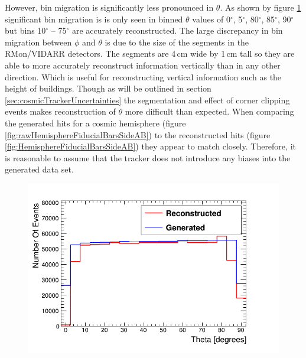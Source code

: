 \clearpage
However, bin migration is significantly less pronounced in $\theta$. As shown by figure \ref{fig:thetaGenVsRecoHem} significant bin migration is is only seen in binned $\theta$ values of 0$^\circ$, 5$^\circ$, 80$^\circ$, 85$^\circ$, 90$^\circ$ but bins 10$^\circ$ -- 75$^\circ$ are accurately reconstructed. The large discrepancy in bin migration between $\phi$ and $\theta$ is due to the size of the segments in the RMon/VIDARR detectors. The segments are 4\,cm wide by 1\,cm tall so they are able to more accurately reconstruct information vertically than in any other direction. Which is useful for reconstructing vertical information such as the height of buildings. Though as will be outlined in section \ref{sec:cosmicTrackerUncertainties} the segmentation and effect of corner clipping events makes reconstruction of $\theta$ more difficult than expected. When comparing the generated hits for a cosmic hemisphere (figure \ref{fig:rawHemisphereFiducialBarsSideAB}) to the reconstructed hits (figure \ref{fig:HemisphereFiducialBarsSideAB}) they appear to match closely. Therefore, it is reasonable to assume that the tracker does not introduce any biases into the generated data set.

\begin{figure}[!h]
 \centering
 \includegraphics[width=0.6\linewidth]{Chapter5/Figs/Raster/hemisphereThetaCompare.png}
 \label{fig:thetaGenVsRecoHem}
\end{figure}

